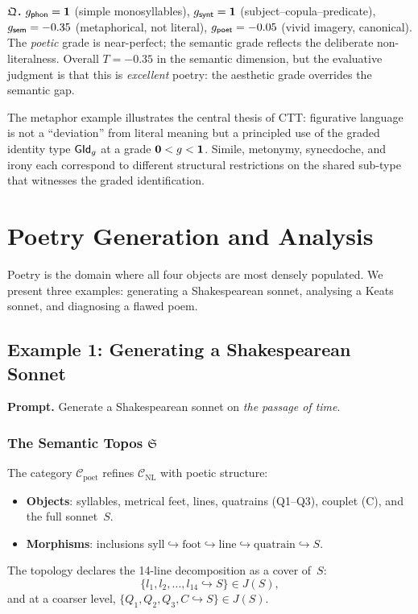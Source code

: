\textbf{$\mathfrak{Q}$.}\quad
$g_{\mathsf{phon}}=\mathbf{1}$ (simple monosyllables),
$g_{\mathsf{synt}}=\mathbf{1}$ (subject--copula--predicate),
$g_{\mathsf{sem}}=-0.35$ (metaphorical, not literal),
$g_{\mathsf{poet}}=-0.05$ (vivid imagery, canonical).
The \emph{poetic} grade is near-perfect; the semantic grade reflects
the deliberate non-literalness.  Overall
$T=-0.35$ in the semantic dimension, but the evaluative judgment
is that this is \emph{excellent} poetry: the aesthetic grade overrides
the semantic gap.

\begin{remark}
The metaphor example illustrates the central thesis of CTT:
figurative language is not a ``deviation'' from literal meaning
but a principled use of the graded identity type $\mathsf{GId}_g$ at a
grade $\mathbf{0} < g < \mathbf{1}$.  Simile, metonymy, synecdoche, and
irony each correspond to different structural restrictions on
the shared sub-type that witnesses the graded identification.
\end{remark}

\chapter{Poetry Generation and Analysis}
\label{ch:ex-poetry}

Poetry is the domain where all four objects are most densely
populated.  We present three examples: generating a Shakespearean
sonnet, analysing a Keats sonnet, and diagnosing a flawed poem.

\section{Example 1: Generating a Shakespearean Sonnet}
\label{sec:sonnet-gen}

\textbf{Prompt.}\; Generate a Shakespearean sonnet on
\emph{the passage of time}.

\subsection{The Semantic Topos $\mathfrak{S}$}

\begin{construction}
\label{con:poet-site}
The category $\mathcal{C}_{\mathrm{poet}}$ refines
$\mathcal{C}_{\mathrm{NL}}$ with poetic structure:
\begin{itemize}[nosep]
  \item \textbf{Objects}: syllables, metrical feet, lines,
    quatrains (Q1--Q3), couplet (C), and the full sonnet~$S$.
  \item \textbf{Morphisms}: inclusions
    $\text{syll}\hookrightarrow\text{foot}\hookrightarrow
     \text{line}\hookrightarrow\text{quatrain}\hookrightarrow S$.
\end{itemize}
The topology declares the 14-line decomposition as a cover of~$S$:
\[
  \{l_1,l_2,\ldots,l_{14}\hookrightarrow S\}\in J(S),
\]
and at a coarser level,
$\{Q_1,Q_2,Q_3,C\hookrightarrow S\}\in J(S)$.
\end{construction}


